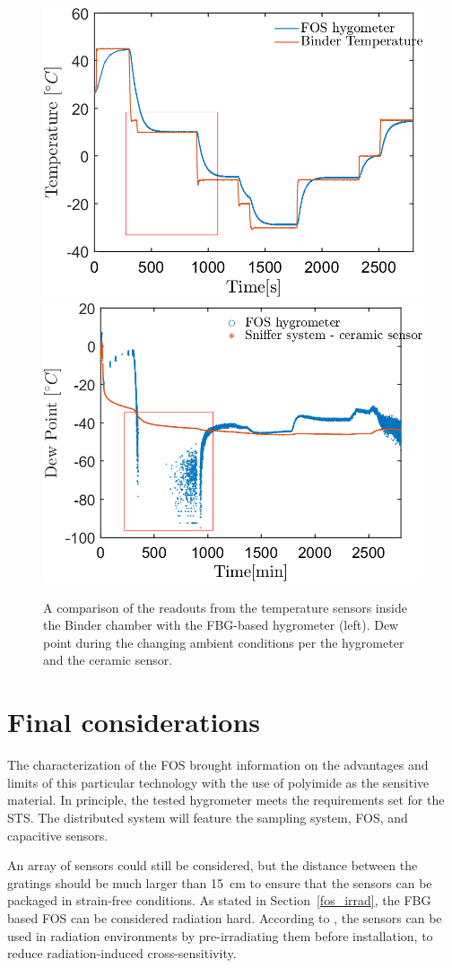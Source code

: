 \begin{figure}[!h]
\centering
\includegraphics[width=0.47\columnwidth]{Chapter5/images/FOS_performance_T.png}
\includegraphics[width=0.49\columnwidth]{Chapter5/images/FOS_performance1.png}
\caption{A comparison of the readouts from the temperature sensors inside the Binder chamber with the \gls{FBG}-based hygrometer (left). Dew point during the changing ambient conditions per the hygrometer and the ceramic sensor.}
\label{Tfig_comparison_2}
\end{figure}

\section{Final considerations}

The characterization of the \gls{FOS} brought information on the advantages and limits of this particular technology with the use of polyimide as the sensitive material. In principle, the tested hygrometer meets the requirements set for the \gls{STS}. The distributed system will feature the sampling system, \gls{FOS}, and capacitive sensors.

An array of sensors could still be considered, but the distance between the gratings should be much larger than \SI{15}{\cm} to ensure that the sensors can be packaged in strain-free conditions. As stated in Section~\ref{fos_irrad}, the \gls{FBG} based \gls{FOS} can be considered radiation hard. According to \cite{Berruti}, the sensors can be used in radiation environments by pre-irradiating them before installation, to reduce radiation-induced cross-sensitivity. 

